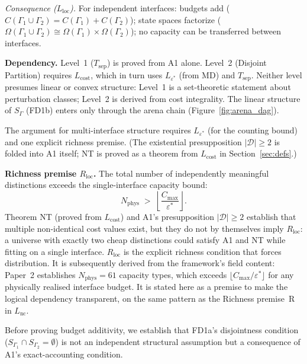 \documentclass[11pt]{article}
\theoremstyle{remark}
\begin{document}
\begin{tcolorbox}[defbox, title={Definition: Independence (Two Levels)}]
\textit{Consequence ($L_{\mathrm{loc}}$).}  For independent interfaces: budgets add ($C(\Gamma_1 \cup \Gamma_2) = C(\Gamma_1) + C(\Gamma_2)$); state spaces factorize ($\Omega(\Gamma_1 \cup \Gamma_2) \cong \Omega(\Gamma_1) \times \Omega(\Gamma_2)$); no capacity can be transferred between interfaces.

\medskip\noindent\textbf{Dependency.}  Level~1 ($T_{\mathrm{sep}}$) is proved from A1 alone.  Level~2 (Disjoint Partition) requires $L_{\mathrm{cost}}$, which in turn uses $L_{\varepsilon^*}$ (from MD) and $T_{\mathrm{sep}}$.  Neither level presumes linear or convex structure: Level~1 is a set-theoretic statement about perturbation classes; Level~2 is derived from cost integrality.  The linear structure of $S_\Gamma$ (FD1b) enters only through the arena chain (Figure~\ref{fig:arena_dag}).
\end{tcolorbox}
The argument for multi-interface structure requires $L_{\varepsilon^*}$ (for the counting bound) and one explicit richness premise.  (The existential presupposition $|\mathcal{D}| \ge 2$ is folded into A1 itself; NT is proved as a theorem from $L_{\mathrm{cost}}$ in Section~\ref{sec:defs}.)

\smallskip\noindent\textbf{Richness premise $R_{\mathrm{loc}}$.}  The total number of independently meaningful distinctions exceeds the single-interface capacity bound:
\begin{equation}
N_{\mathrm{phys}} \;>\; \left\lfloor \frac{C_{\max}}{\varepsilon^*} \right\rfloor.
\end{equation}
Theorem NT (proved from $L_{\mathrm{cost}}$) and A1's presupposition $|\mathcal{D}| \ge 2$ establish that multiple non-identical cost values exist, but they do not by themselves imply $R_{\mathrm{loc}}$: a universe with exactly two cheap distinctions could satisfy A1 and NT while fitting on a single interface.  $R_{\mathrm{loc}}$ is the explicit richness condition that forces distribution.  It is subsequently derived from the framework's field content: Paper~2 establishes $N_{\mathrm{phys}} = 61$ capacity types, which exceeds $\lfloor C_{\max}/\varepsilon^* \rfloor$ for any physically realised interface budget.  It is stated here as a premise to make the logical dependency transparent, on the same pattern as the Richness premise~R in $L_{\mathrm{nc}}$.

Before proving budget additivity, we establish that FD1a's disjointness condition ($S_{\Gamma_1} \cap S_{\Gamma_2} = \emptyset$) is not an independent structural assumption but a consequence of A1's exact-accounting condition.
\end{document}
